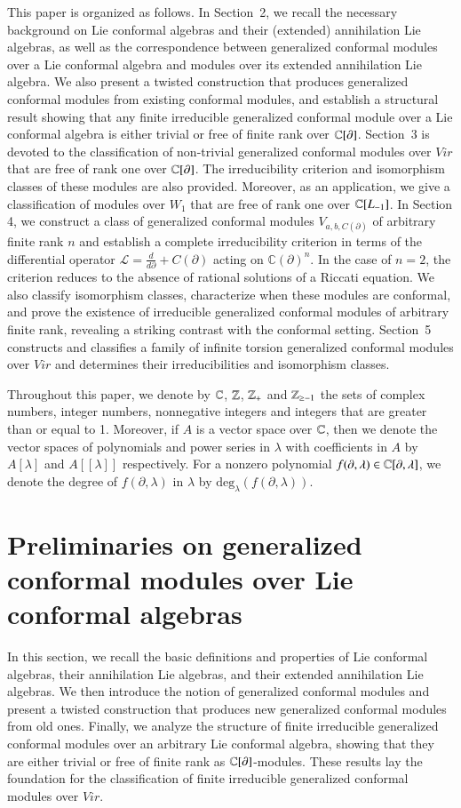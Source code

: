 \documentclass[12pt]{amsart}
\begin{document}
This paper is organized as follows. In Section~2, we recall the necessary background on Lie conformal algebras and their (extended) annihilation Lie algebras, as well as the correspondence between generalized conformal modules over a Lie conformal algebra and modules over its extended annihilation Lie algebra. We also present a twisted construction that produces generalized conformal modules from existing conformal modules, and establish a structural result showing that any finite irreducible generalized conformal module over a Lie conformal algebra is either trivial or free of finite rank over $\mathbb{C}[\partial]$. Section~3 is devoted to the classification of non-trivial generalized conformal modules over $Vir$ that are free of rank one over $\mathbb{C}[\partial]$. The irreducibility criterion and isomorphism classes of these modules are also provided.
Moreover, as an application, we give a classification of modules over $W_1$ that are free of rank one over $\mathbb{C}[L_{-1}]$.
In Section 4, we construct a class of generalized conformal modules $V_{a,b,C(\partial)}$ of arbitrary finite rank $n$ and establish a complete irreducibility criterion in terms of the differential operator $\mathcal L=\frac{d}{d\partial}+C(\partial)$ acting on $\mathbb C(\partial)^n$. In the case of $n=2$, the criterion reduces to the absence of rational solutions of a Riccati equation. We also classify isomorphism classes, characterize when these modules are conformal, and prove the existence of irreducible generalized conformal modules of arbitrary finite rank, revealing a striking contrast with the conformal setting. Section~5 constructs and classifies a family of infinite torsion generalized conformal modules over $Vir$ and determines their irreducibilities and isomorphism classes.

Throughout this paper, we denote by $\mathbb{C}$, $\mathbb{Z}$,  $\mathbb{Z}_+$ and $\mathbb{Z}_{\geq -1}$ the sets of complex numbers, integer numbers, nonnegative integers and integers that are greater than or equal to  1. Moreover, if $A$ is a vector space over $\mathbb{C}$, then we denote the vector spaces of polynomials and power series in $\lambda$ with coefficients in $A$  by $A[\lambda]$ and $A[[\lambda]]$ respectively. For a nonzero polynomial $f(\partial,\lambda)\in \mathbb{C}[\partial, \lambda]$, we denote the degree of $f(\partial,\lambda)$ in $\lambda$ by $\text{deg}_\lambda(f(\partial,\lambda))$.

\section{Preliminaries on generalized conformal modules over Lie conformal algebras}
In this section, we recall the basic definitions and properties of Lie conformal algebras, their annihilation Lie algebras, and their extended annihilation Lie algebras. We then introduce the notion of generalized conformal modules  and present a twisted construction that produces new generalized conformal modules from old ones. Finally, we analyze the structure of finite irreducible generalized conformal modules over an arbitrary Lie conformal algebra, showing that they are either trivial or free of finite rank as $\mathbb{C}[\partial]$-modules. These results lay the foundation for the classification of finite irreducible generalized conformal modules over $Vir$.
\end{document}
